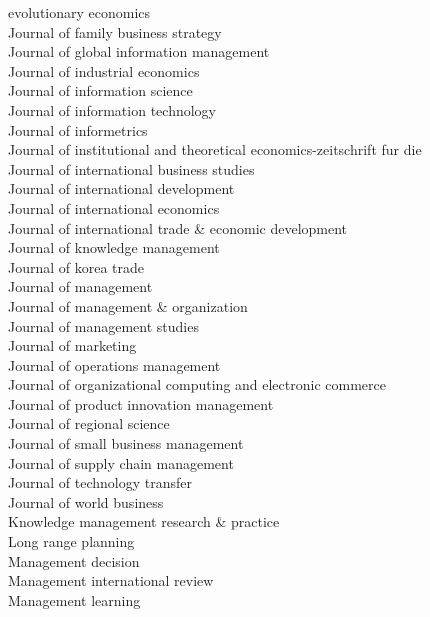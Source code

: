 \documentclass[a4paper]{article}
\begin{document}
\begin{footnotesize}
evolutionary economics \\ Journal of family business strategy \\ Journal of global information management \\ Journal of industrial economics \\ Journal of information science \\ Journal of information technology \\ Journal of informetrics \\ Journal of institutional and theoretical economics-zeitschrift fur die \\ Journal of international business studies \\ Journal of international development \\ Journal of international economics \\ Journal of international trade \& economic development \\ Journal of knowledge management \\ Journal of korea trade \\ Journal of management \\ Journal of management \& organization \\ Journal of management studies \\ Journal of marketing \\ Journal of operations management \\ Journal of organizational computing and electronic commerce \\ Journal of product innovation management \\ Journal of regional science \\ Journal of small business management \\ Journal of supply chain management \\ Journal of technology transfer \\ Journal of world business \\ Knowledge management research \& practice \\ Long range planning \\ Management decision \\ Management international review \\ Management learning \\ 
\end{footnotesize}
\end{document}
